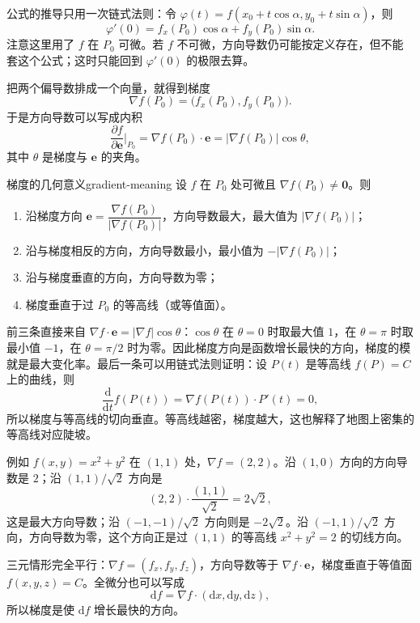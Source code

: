 公式的推导只用一次链式法则：令 \(\varphi(t)=f(x_0+t\cos\alpha,y_0+t\sin\alpha)\)，则
\[
    \varphi'(0)=f_x(P_0)\cos\alpha+f_y(P_0)\sin\alpha.
\]
注意这里用了 \(f\) 在 \(P_0\) 可微。若 \(f\) 不可微，方向导数仍可能按定义存在，但不能套这个公式；这时只能回到 \(\varphi'(0)\) 的极限去算。

把两个偏导数排成一个向量，就得到梯度
\[
    \nabla f(P_0)=\bigl(f_x(P_0),f_y(P_0)\bigr).
\]
于是方向导数可以写成内积
\[
    \frac{\partial f}{\partial\mathbf e}\Big|_{P_0}
    =\nabla f(P_0)\cdot\mathbf e
    =\lvert\nabla f(P_0)\rvert\cos\theta,
\]
其中 \(\theta\) 是梯度与 \(\mathbf e\) 的夹角。

\begin{conclusion}{梯度的几何意义}{gradient-meaning}
    设 \(f\) 在 \(P_0\) 处可微且 \(\nabla f(P_0)\neq\mathbf 0\)。则
    \begin{enumerate}
        \item 沿梯度方向 \(\mathbf e=\dfrac{\nabla f(P_0)}{\lvert\nabla f(P_0)\rvert}\)，方向导数最大，最大值为 \(\lvert\nabla f(P_0)\rvert\)；
        \item 沿与梯度相反的方向，方向导数最小，最小值为 \(-\lvert\nabla f(P_0)\rvert\)；
        \item 沿与梯度垂直的方向，方向导数为零；
        \item 梯度垂直于过 \(P_0\) 的等高线（或等值面）。
    \end{enumerate}
\end{conclusion}

前三条直接来自 \(\nabla f\cdot\mathbf e=\lvert\nabla f\rvert\cos\theta\)：\(\cos\theta\) 在 \(\theta=0\) 时取最大值 \(1\)，在 \(\theta=\pi\) 时取最小值 \(-1\)，在 \(\theta=\pi/2\) 时为零。因此梯度方向是函数增长最快的方向，梯度的模就是最大变化率。最后一条可以用链式法则证明：设 \(P(t)\) 是等高线 \(f(P)=C\) 上的曲线，则
\[
    \frac{\mathrm{d}}{\mathrm{d}t}f(P(t))
    =\nabla f(P(t))\cdot P'(t)=0,
\]
所以梯度与等高线的切向垂直。等高线越密，梯度越大，这也解释了地图上密集的等高线对应陡坡。

例如 \(f(x,y)=x^2+y^2\) 在 \((1,1)\) 处，\(\nabla f=(2,2)\)。沿 \((1,0)\) 方向的方向导数是 \(2\)；沿 \((1,1)/\sqrt2\) 方向是
\[
    (2,2)\cdot\frac{(1,1)}{\sqrt2}=2\sqrt2,
\]
这是最大方向导数；沿 \((-1,-1)/\sqrt2\) 方向则是 \(-2\sqrt2\)。沿 \((-1,1)/\sqrt2\) 方向，方向导数为零，这个方向正是过 \((1,1)\) 的等高线 \(x^2+y^2=2\) 的切线方向。

三元情形完全平行：\(\nabla f=(f_x,f_y,f_z)\)，方向导数等于 \(\nabla f\cdot\mathbf e\)，梯度垂直于等值面 \(f(x,y,z)=C\)。全微分也可以写成
\[
    \mathrm{d}f=\nabla f\cdot(\mathrm{d}x,\mathrm{d}y,\mathrm{d}z),
\]
所以梯度是使 \(\mathrm{d}f\) 增长最快的方向。

